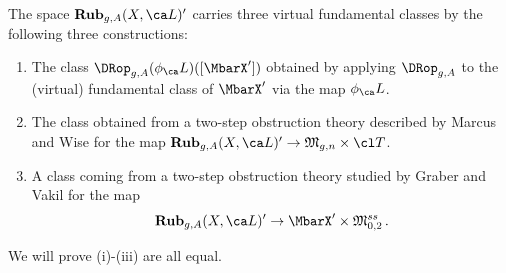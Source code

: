 The space $\cat{Rub}_{g,A}(X, \ca L)'$ carries three virtual fundamental classes by
the following three constructions:
\begin{enumerate}
\item[(i)] The class $\DRop_{g,A}(\phi_\ca L)([\MbarX'])$ obtained by applying %
$\DRop_{g,A}$
to the (virtual) fundamental class of $\MbarX'$ via the map $\phi_\ca L$.
\item[(ii)] The class obtained from a two-step obstruction theory described by Marcus and Wise \cite{Marcus2017Logarithmic-com} for the map $\cat{Rub}_{g,A}(X, \ca L)' \to \frak M_{g,n} \times \cl T$.
\item[(iii)]  A class coming from a two-step obstruction theory studied by
Graber and Vakil \cite{Graber2005Relative-virtua} for the map
$$\cat{Rub}_{g,A}(X, \ca L)' \to \MbarX' \times \frak M_{0,2}^{ss}\, .$$
\end{enumerate}
We will prove (i)-(iii) are all equal.






